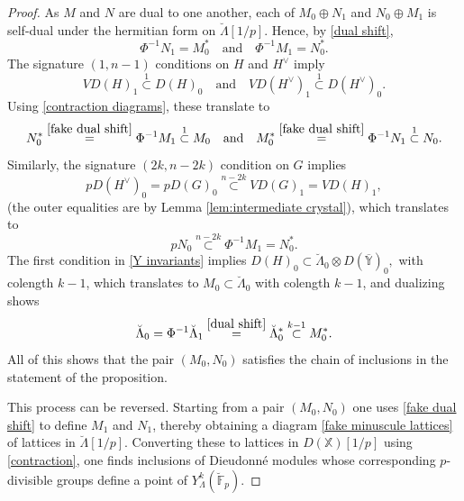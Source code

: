\documentclass[11pt]{alggeom}
\newcommand{\F}{\mathbb F}
\begin{document}
\begin{proof}
As $M$ and $N$ are dual to one another, each of   $M_0\oplus N_1$ and $N_0\oplus M_1$ is self-dual under the hermitian form on $\breve{\Lambda}[1/p]$.  Hence, by \eqref{dual shift},
\begin{equation}\label{fake dual shift}
\Phi^{-1} N_1 = M_0^* \quad  \mbox{and} \quad  \Phi^{-1} M_1 =N_0^*.
\end{equation}
 The signature $(1,n-1)$ conditions on $H$ and $H^\vee$ imply 
 \[
 VD(H)_1 \stackrel{1}{\subset}   D(H)_0   \quad  \mbox{and}\quad  VD(H^\vee)_1 \stackrel{1}{\subset}   D(H^\vee)_0 .
\]
Using \eqref{contraction diagrams}, these translate to 
\[
N_0^* \stackrel{\eqref{fake dual shift}}{=} \Phi^{-1} M_1 \stackrel{1}{\subset} M_0 
\quad\mbox{and}\quad  
M_0^*  \stackrel{\eqref{fake dual shift}}{=}   \Phi^{-1} N_1 \stackrel{1}{\subset} N_0.
\]
Similarly, the signature $(2k,n-2k)$ condition on $G$ implies 
\[
p  D(H^\vee)_0  =    p D(G)_0 
  \stackrel{n-2k}{\subset} 
  VD(G)_1 =   V D(H)_1,
\]
(the outer equalities are by Lemma \ref{lem:intermediate crystal}), which  translates to 
\[
pN_0 \stackrel{n-2k}{\subset}   \Phi^{-1} M_1 =N_0^*.
\]
The first  condition in \eqref{Y invariants} implies
$
  D(H)_0 \subset  \breve{\Lambda}_0   \otimes D(\overline{\mathbb{Y}})_0   ,
$
with colength $k-1$, 
which translates to $M_0 \subset \breve{\Lambda}_0$ with colength $k-1$, and  dualizing shows 
\[
\breve{\Lambda}_0 = \Phi^{-1} \breve{\Lambda}_1 
\stackrel{\eqref{dual shift}}{=} 
 \breve{\Lambda}_0^* \stackrel{k-1}{\subset} M_0^* .
\]
All of this shows that the pair $(M_0,N_0)$ satisfies the chain of inclusions in the statement of the proposition.



This process can be reversed.  Starting from a pair $(M_0,N_0)$ one uses \eqref{fake dual shift} to define $M_1$ and $N_1$, thereby  obtaining a diagram \eqref{fake minuscule lattices} of lattices in $\breve{\Lambda}[1/p]$.  
Converting these to lattices in $D(\mathbb{X})[1/p]$ using 
 \eqref{contraction}, one finds inclusions of Dieudonn\'e modules whose corresponding $p$-divisible groups define a point of  $Y^k_\Lambda(\breve{\F}_p)$.  





\end{proof}
\end{document}
